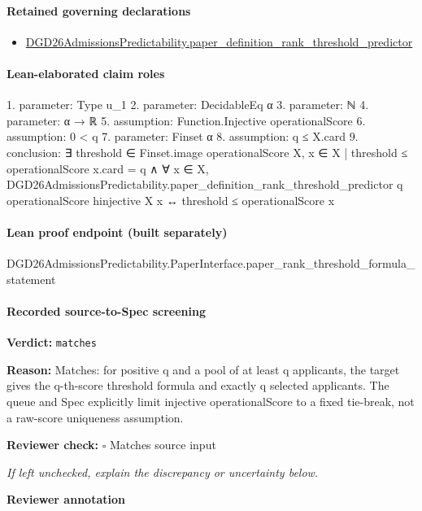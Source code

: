\documentclass[10pt]{article}
\newcommand{\reviewerbox}{%
  \par\noindent\fbox{\parbox{0.96\linewidth}{\rule{0pt}{0.38in}}}\par
}
\newcommand{\reviewmatch}[1]{%
  \par\noindent\textbf{Reviewer check:} $\square$\; #1\par
  \noindent\emph{If left unchecked, explain the discrepancy or uncertainty below.}\par
}
\begin{document}
\paragraph{Retained governing declarations}
\begin{itemize}\raggedright
\item \hyperlink{governing-declaration-302cb3b60c7e48b6}{DGD26\allowbreak{}Admissions\allowbreak{}Predictability.\allowbreak{}paper\_\allowbreak{}definition\_\allowbreak{}rank\_\allowbreak{}threshold\_\allowbreak{}predictor}
\end{itemize}
\paragraph{Lean-elaborated claim roles}\begin{ReviewVerbatim}
1. parameter: Type u_1
2. parameter: DecidableEq α
3. parameter: ℕ
4. parameter: α → ℝ
5. assumption: Function.Injective operationalScore
6. assumption: 0 < q
7. parameter: Finset α
8. assumption: q ≤ X.card
9. conclusion: ∃ threshold ∈ Finset.image operationalScore X,
  {x ∈ X | threshold ≤ operationalScore x}.card = q ∧
    ∀ x ∈ X,
      DGD26AdmissionsPredictability.paper_definition_rank_threshold_predictor q operationalScore hinjective X x ↔
        threshold ≤ operationalScore x
\end{ReviewVerbatim}

\paragraph{Lean proof endpoint (built separately)}\begin{ReviewVerbatim}
DGD26AdmissionsPredictability.PaperInterface.paper_rank_threshold_formula_statement
\end{ReviewVerbatim}

\paragraph{Recorded source-to-Spec screening}
\textbf{Verdict:} \texttt{matches}
\\
{\raggedright
\textbf{Reason:} Matches:\allowbreak{} for positive q and a pool of at least q applicants, the target gives the q-\allowbreak{}th-\allowbreak{}score threshold formula and exactly q selected applicants.\allowbreak{} The queue and Spec explicitly limit injective operationalScore to a fixed tie-\allowbreak{}break, not a raw-\allowbreak{}score uniqueness assumption.\allowbreak{}
\par}
\reviewmatch{Matches source input}
\noindent\textbf{Reviewer annotation}\par
\reviewerbox
\clearpage
\hypertarget{source-claim-b05952c99a84b6af}{}
\end{document}
